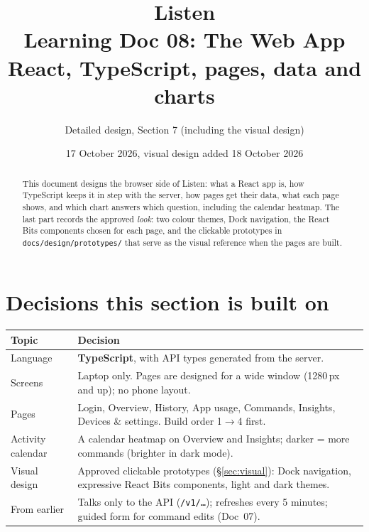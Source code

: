 \documentclass[11pt,a4paper]{article}
\title{\textbf{Listen}\\[4pt]\large Learning Doc 08: The Web App\\
       \normalsize React, TypeScript, pages, data and charts}
\author{Detailed design, Section 7 (including the visual design)}
\date{17 October 2026, visual design added 18 October 2026}
\begin{document}
\maketitle

\begin{abstract}
\noindent This document designs the browser side of Listen: what a React app is, how
TypeScript keeps it in step with the server, how pages get their data, what each page shows,
and which chart answers which question, including the calendar heatmap. The last part records
the approved \emph{look}: two colour themes, Dock navigation, the React Bits components chosen
for each page, and the clickable prototypes in \texttt{docs/design/prototypes/} that serve as
the visual reference when the pages are built.
\end{abstract}

\tableofcontents
\newpage

\section{Decisions this section is built on}
\begin{center}
\renewcommand{\arraystretch}{1.2}
\begin{tabularx}{\textwidth}{l X}
\toprule
\textbf{Topic} & \textbf{Decision} \\
\midrule
Language     & \textbf{TypeScript}, with API types generated from the server. \\
Screens      & Laptop only. Pages are designed for a wide window (1280\,px and up); no phone layout. \\
Pages        & Login, Overview, History, App usage, Commands, Insights, Devices \& settings. Build order 1$\to$4 first. \\
Activity calendar & A calendar heatmap on Overview and Insights; darker = more commands (brighter in dark mode). \\
Visual design & Approved clickable prototypes (\S\ref{sec:visual}): Dock navigation, expressive React Bits components, light and dark themes. \\
From earlier & Talks only to the API (\texttt{/v1/\ldots}); refreshes every 5 minutes; guided form for command edits (Doc~07). \\
\bottomrule
\end{tabularx}
\end{center}

\end{document}
